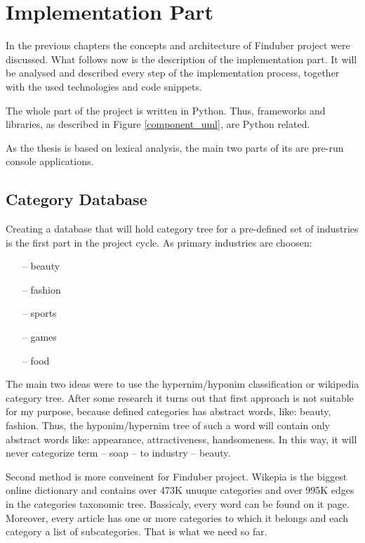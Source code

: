 \section{Implementation Part}
In the previous chapters the concepts and architecture of Finduber project were discussed. What follows now is the description of the implementation part. It will be analysed and described every step of the implementation process, together with the used technologies and code snippets. 

The whole part of the project is written in Python. Thus, frameworks and libraries, as described in Figure \ref{component_uml}, are Python related.

As the thesis is based on lexical analysis, the main two parts of its are pre-run console applications.

\subsection{Category Database}
Creating a database that will hold category tree for a pre-defined set of industries is the first part in the project cycle. As primary industries are choosen:

\begin{enumerate}
\item[--] beauty
\item[--] fashion
\item[--] sports
\item[--] games
\item[--] food
\end{enumerate}

The main two ideas were to use the hypernim/hyponim classification or wikipedia category tree. After some research it turns out that first approach is not suitable for my purpose, because defined categories has abstract words, like: beauty, fashion. Thus, the hyponim/hypernim tree of such a word will contain only abstract words like: appearance, attractiveness, handsomeness. In this way, it will never categorize term -- soap -- to industry -- beauty. 

Second method is more conveinent for Finduber project. Wikepia is the biggest online dictionary and contains over 473K unuque categories and over 995K edges in the categories taxonomic tree. Bassicaly, every word can be found on it page. Moreover, every article has one or more categories to which it belongs and each category a list of subcategories. That is what we need so far. 

